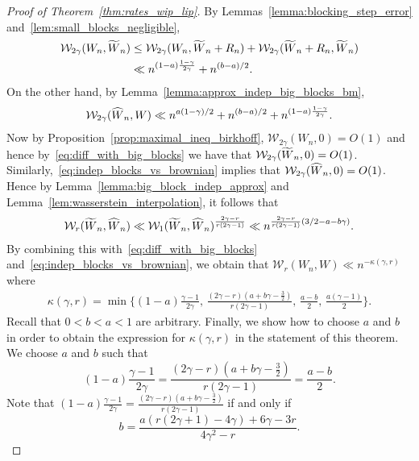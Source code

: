 \documentclass[11pt,a4paper,reqno,oneside]{amsart}
\newcommand{\wass}{\mathcal{W}}
\newcommand{\shat}[1]{\vphantom{#1}\smash[t]{\widehat{#1}}}
\newcommand{\stilde}[1]{\vphantom{#1}\smash[t]{\widetilde{#1}}}
\theoremstyle{definition}
\theoremstyle{remark}
\numberwithin{equation}{section}
\begin{document}
\begin{proof}[Proof of Theorem~\ref{thm:rates_wip_lip}]
	By Lemmas~\ref{lemma:blocking_step_error} and~\ref{lem:small_blocks_negligible},
	\begin{align}
		\wass_{2\gamma}(W_n,\stilde W_n)&\le \wass_{2\gamma}(W_n, \stilde W_n+R_n)+\wass_{2\gamma}(\stilde W_n+R_n, \stilde W_n)\nonumber\\
		&\ll n^{(1-a)\frac{1-\gamma}{2\gamma}}+n^{(b-a)/2}.\label{eq:diff_with_big_blocks}
	\end{align}
	On the other hand, by Lemma~\ref{lemma:approx_indep_big_blocks_bm},
	\begin{align}
		\wass_{2\gamma}(\shat W_n,W)\ll n^{a(1-\gamma)/2}+ n^{(b-a)/2}+n^{(1-a)\frac{1-\gamma}{2\gamma}}.\label{eq:indep_blocks_vs_brownian}
	\end{align}
	Now by Proposition~\ref{prop:maximal_ineq_birkhoff}, $\wass_{2\gamma}(W_n,0)=O(1)$ and hence by~\eqref{eq:diff_with_big_blocks} we have that $\wass_{2\gamma}(\stilde W_n, 0)=O(1)$. Similarly,~\eqref{eq:indep_blocks_vs_brownian} implies that $\wass_{2\gamma}(\shat W_n, 0)=O(1)$. Hence by Lemma~\ref{lemma:big_block_indep_approx} and Lemma~\ref{lem:wasserstein_interpolation}, it follows that 
	\begin{align*}
		\wass_r(\stilde W_n, \shat W_n)\ll \wass_1(\stilde W_n, \shat W_n)^\frac{2\gamma-r}{r(2\gamma-1)}\ll n^{\frac{2\gamma-r}{r(2\gamma-1)}(3/2-a-b\gamma)}.
	\end{align*}
	By combining this with~\eqref{eq:diff_with_big_blocks} and~\eqref{eq:indep_blocks_vs_brownian}, we obtain that $ \wass_r(W_n, W)\ll n^{-\kappa(\gamma,r)} $ where
	\begin{align}
		\kappa(\gamma,r)=\min\Big\{(1-a)\frac{\gamma-1}{2\gamma},\, \frac{(2\gamma-r)(a+b\gamma-\frac{3}{2})}{r(2\gamma-1)},\, \frac{a-b}{2},\, \frac{a(\gamma-1)}{2}\Big\}.\label{eq:wip_implicit_Wp_bd}
	\end{align}
	Recall that $ 0<b<a<1 $ are arbitrary. Finally, we show how to choose $ a $ and $ b $ in order to obtain the expression for $ \kappa(\gamma,r) $ in the statement of this theorem. We choose $a$ and $b$ such that 
	\[ (1-a)\frac{\gamma-1}{2\gamma}=\frac{(2\gamma-r)(a+b\gamma-\frac{3}{2})}{r(2\gamma-1)}=\frac{a-b}{2}. \]
	Note that $ (1-a)\frac{\gamma-1}{2\gamma}=\frac{(2\gamma-r)(a+b\gamma-\frac{3}{2})}{r(2\gamma-1)}$ if and only if
	\begin{equation}\label{eq:b_eq_1}
		b = \frac{a(r(2\gamma+1)-4\gamma)+6\gamma-3r}{4\gamma^2-r}.
	\end{equation}

\end{proof}
\end{document}
